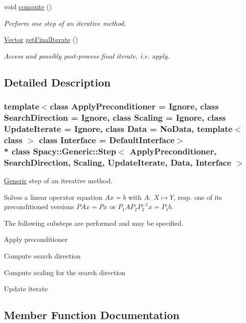 \begin{DoxyCompactItemize}
\item 
void \hyperlink{classSpacy_1_1Generic_1_1Step_ac400c25a81a5138b4926bbb99692b343}{compute} ()
\begin{DoxyCompactList}\small\item\em Perform one step of an iterative method. \end{DoxyCompactList}\item 
\hyperlink{classSpacy_1_1Generic_1_1Vector}{Vector} \hyperlink{classSpacy_1_1Generic_1_1Step_a5be9a8afa47319b645b2df73b3b23acc}{get\+Final\+Iterate} ()
\begin{DoxyCompactList}\small\item\em Access and possibly post-\/process final iterate, i.\+e. apply. \end{DoxyCompactList}\end{DoxyCompactItemize}


\subsection{Detailed Description}
\subsubsection*{template$<$class Apply\+Preconditioner = Ignore, class Search\+Direction = Ignore, class Scaling = Ignore, class Update\+Iterate = Ignore, class Data = No\+Data, template$<$ class $>$ class Interface = Default\+Interface$>$\\*
class Spacy\+::\+Generic\+::\+Step$<$ Apply\+Preconditioner, Search\+Direction, Scaling, Update\+Iterate, Data, Interface $>$}

\hyperlink{namespaceSpacy_1_1Generic}{Generic} step of an iterative method. 

Solves a linear operator equation $Ax=b$ with $A:\ X\mapsto Y$, resp. one of its preconditioned versions $PAx=Px$ or $P_1AP_2P_2^{-1}x=P_1b$.

The following substeps are performed and may be specified.
\begin{DoxyEnumerate}
\item Apply preconditioner
\item Compute search direction
\item Compute scaling for the search direction
\item Update iterate 
\end{DoxyEnumerate}

\subsection{Member Function Documentation}
